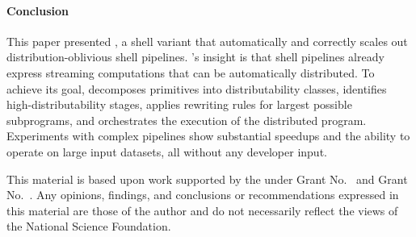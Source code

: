 \documentclass[acmsmall,10pt,review,anonymous]{acmart}
\newcommand{\kk}[1]{[{\color{magenta}#1 --- kk}]}
\begin{document}

\paragraph{Conclusion}
This paper presented \sys, a shell variant that automatically and correctly scales out distribution-oblivious shell pipelines. 
\sys's insight is that shell pipelines already express streaming computations that can be automatically distributed.
To achieve its goal, \sys
  decomposes primitives into distributability classes,
  identifies high-distributability stages,
  applies rewriting rules for largest possible subprograms,
  and orchestrates the execution of the distributed program.
Experiments with complex pipelines show substantial speedups and the ability to operate on large input datasets, all without any developer input.

\begin{acks}
  This material is based upon work supported by the
   under Grant
  No.~ and Grant
  No.~.  Any opinions, findings, and
  conclusions or recommendations expressed in this material are those
  of the author and do not necessarily reflect the views of the
  National Science Foundation.
\end{acks}






\end{document}
